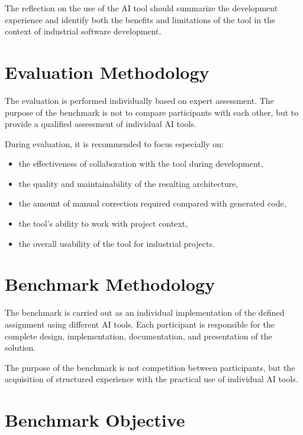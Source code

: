 \documentclass[12pt,a4paper]{article}
\begin{document}
The reflection on the use of the AI tool should summarize the development experience
and identify both the benefits and limitations of the tool in the context
of industrial software development.

\section{Evaluation Methodology}

The evaluation is performed individually based on expert assessment.
The purpose of the benchmark is not to compare participants with each other,
but to provide a qualified assessment of individual AI tools.

During evaluation, it is recommended to focus especially on:

\begin{itemize}
    \item the effectiveness of collaboration with the tool during development,
    \item the quality and maintainability of the resulting architecture,
    \item the amount of manual correction required compared with generated code,
    \item the tool's ability to work with project context,
    \item the overall usability of the tool for industrial projects.
\end{itemize}

\section{Benchmark Methodology}

The benchmark is carried out as an individual implementation
of the defined assignment using different AI tools.
Each participant is responsible for the complete design,
implementation, documentation, and presentation of the solution.

The purpose of the benchmark is not competition between participants,
but the acquisition of structured experience
with the practical use of individual AI tools.

\section{Benchmark Objective}
\end{document}
